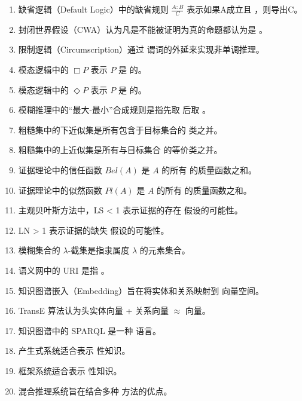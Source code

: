 \begin{enumerate}[resume,leftmargin=2em,itemsep=1pt]
\item 缺省逻辑（Default Logic）中的缺省规则 $\frac{A:B}{C}$ 表示如果A成立且 \underline{\hspace{3em}}，则导出C。
\item 封闭世界假设（CWA）认为凡是不能被证明为真的命题都认为是 \underline{\hspace{3em}}。
\item 限制逻辑（Circumscription）通过 \underline{\hspace{3em}} 谓词的外延来实现非单调推理。
\item 模态逻辑中的 $\Box P$ 表示 $P$ 是 \underline{\hspace{3em}} 的。
\item 模态逻辑中的 $\Diamond P$ 表示 $P$ 是 \underline{\hspace{3em}} 的。
\item 模糊推理中的“最大-最小”合成规则是指先取 \underline{\hspace{3em}} 后取 \underline{\hspace{3em}}。
\item 粗糙集中的下近似集是所有包含于目标集合的 \underline{\hspace{3em}} 类之并。
\item 粗糙集中的上近似集是所有与目标集合 \underline{\hspace{3em}} 的等价类之并。
\item 证据理论中的信任函数 $Bel(A)$ 是 $A$ 的所有 \underline{\hspace{3em}} 的质量函数之和。
\item 证据理论中的似然函数 $Pl(A)$ 是 $A$ 的所有 \underline{\hspace{3em}} 的质量函数之和。
\item 主观贝叶斯方法中，LS < 1 表示证据的存在 \underline{\hspace{3em}} 假设的可能性。
\item LN > 1 表示证据的缺失 \underline{\hspace{3em}} 假设的可能性。
\item 模糊集合的 $\lambda$-截集是指隶属度 \underline{\hspace{3em}} $\lambda$ 的元素集合。
\item 语义网中的 URI 是指 \underline{\hspace{3em}}。
\item 知识图谱嵌入（Embedding）旨在将实体和关系映射到 \underline{\hspace{3em}} 向量空间。
\item TransE 算法认为头实体向量 + 关系向量 $\approx$ \underline{\hspace{3em}} 向量。
\item 知识图谱中的 SPARQL 是一种 \underline{\hspace{3em}} 语言。
\item 产生式系统适合表示 \underline{\hspace{3em}} 性知识。
\item 框架系统适合表示 \underline{\hspace{3em}} 性知识。
\item 混合推理系统旨在结合多种 \underline{\hspace{3em}} 方法的优点。
\end{enumerate}

